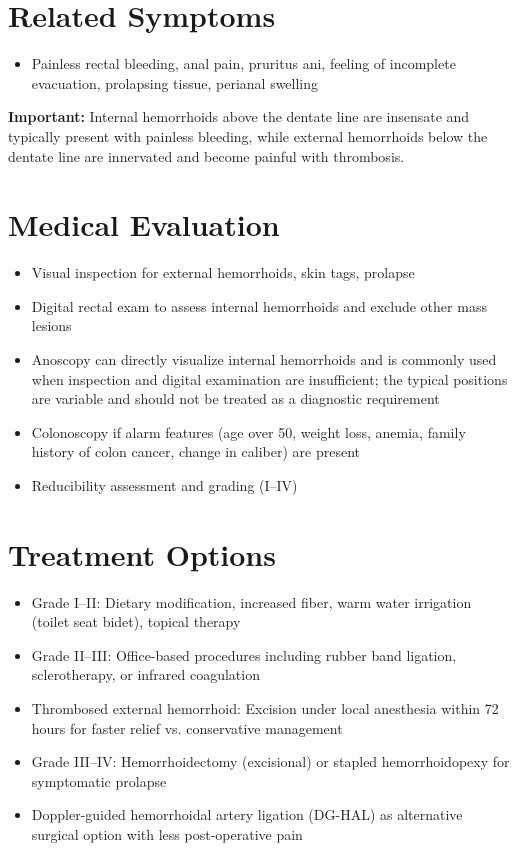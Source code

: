 \section*{Related Symptoms}
\begin{itemize}
  \item Painless rectal bleeding, anal pain, pruritus ani, feeling of incomplete evacuation, prolapsing tissue, perianal swelling
\end{itemize}
\textbf{Important:} Internal hemorrhoids above the dentate line are insensate and typically present with painless bleeding, while external hemorrhoids below the dentate line are innervated and become painful with thrombosis.

\section*{Medical Evaluation}
\begin{itemize}
  \item Visual inspection for external hemorrhoids, skin tags, prolapse
  \item Digital rectal exam to assess internal hemorrhoids and exclude other mass lesions
  \item Anoscopy can directly visualize internal hemorrhoids and is commonly used when inspection and digital examination are insufficient; the typical positions are variable and should not be treated as a diagnostic requirement
  \item Colonoscopy if alarm features (age over 50, weight loss, anemia, family history of colon cancer, change in caliber) are present
  \item Reducibility assessment and grading (I--IV)
\end{itemize}

\section*{Treatment Options}
\begin{itemize}
  \item Grade I--II: Dietary modification, increased fiber, warm water irrigation (toilet seat bidet), topical therapy
  \item Grade II--III: Office-based procedures including rubber band ligation, sclerotherapy, or infrared coagulation
  \item Thrombosed external hemorrhoid: Excision under local anesthesia within 72 hours for faster relief vs. conservative management
  \item Grade III--IV: Hemorrhoidectomy (excisional) or stapled hemorrhoidopexy for symptomatic prolapse
  \item Doppler-guided hemorrhoidal artery ligation (DG-HAL) as alternative surgical option with less post-operative pain
\end{itemize}

